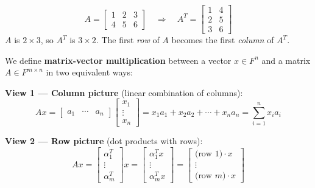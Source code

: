 \documentclass[11pt]{article}
\theoremstyle{definition}
\theoremstyle{plain}
\theoremstyle{remark}
\begin{document}
\begin{workedexample}[title=\textbf{Worked Example: Transpose}]
\[
A = \begin{bmatrix} 1 & 2 & 3 \\ 4 & 5 & 6 \end{bmatrix} \quad \Longrightarrow \quad A^T = \begin{bmatrix} 1 & 4 \\ 2 & 5 \\ 3 & 6 \end{bmatrix}
\]
$A$ is $2 \times 3$, so $A^T$ is $3 \times 2$. The first \textit{row} of $A$ becomes the first \textit{column} of $A^T$.
\end{workedexample}

We define \textbf{matrix-vector multiplication} between a vector $x \in F^n$ and a matrix $A \in F^{m \times n}$ in two equivalent ways:

\textbf{View 1 --- Column picture} (linear combination of columns):
\[
Ax = \begin{bmatrix} a_1 & \cdots & a_n \end{bmatrix} \begin{bmatrix} x_1 \\ \vdots \\ x_n \end{bmatrix} = x_1 a_1 + x_2 a_2 + \cdots + x_n a_n = \sum_{i=1}^{n} x_i a_i
\]

\textbf{View 2 --- Row picture} (dot products with rows):
\[
Ax = \begin{bmatrix} \alpha_1^T \\ \vdots \\ \alpha_m^T \end{bmatrix} x = \begin{bmatrix} \alpha_1^T x \\ \vdots \\ \alpha_m^T x \end{bmatrix} = \begin{bmatrix} \text{(row 1)} \cdot x \\ \vdots \\ \text{(row $m$)} \cdot x \end{bmatrix}
\]
\end{document}
